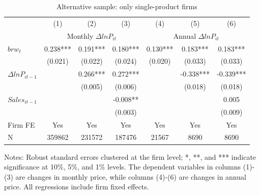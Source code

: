\begin{table}[htbp]
    \centering
    \caption{Alternative sample: only single-product firms}
    \begin{threeparttable}
    \begin{tabular}{lcccccc}
        \toprule
        & (1)   & (2)   & (3)   & (4)   & (5)   & (6) \\
        & \multicolumn{3}{c}{Monthly $\Delta ln P_{it}$} & \multicolumn{3}{c}{Annual $\Delta ln P_{it}$}  \\
        \midrule
        $brw_t$   & 0.238*** & 0.191*** & 0.180*** & 0.130*** & 0.183*** & 0.183*** \\
              & (0.021) & (0.022) & (0.024) & (0.020) & (0.033) & (0.033) \\
        $\Delta ln P_{it-1}$ &       & 0.266*** & 0.272*** &       & -0.338*** & -0.339***\\
              &       & (0.005) & (0.006) &       &   (0.018) & (0.018) \\
        $Sales_{it-1}$ &       &       & -0.008** &       &       & 0.005  \\
              &       &       & (0.003) &       &       &  (0.009) \\
        \midrule
        Firm FE & Yes   & Yes   & Yes   & Yes   & Yes   & Yes \\
        N     & 359862 & 231572 & 187476 & 21567 & 8690  & 8690 \\
        \bottomrule
    \end{tabular}
        \begin{tablenotes}
            \footnotesize
            \item Notes: Robust standard errors clustered at the firm level;  *, **, and *** indicate significance at 10\%, 5\%, and 1\% levels. The dependent variables in columns (1)-(3) are changes in monthly price, while columns (4)-(6) are changes in annual price. All regressions include firm fixed effects.
	\end{tablenotes}
    \end{threeparttable}
    \label{tab.single}
\end{table}

